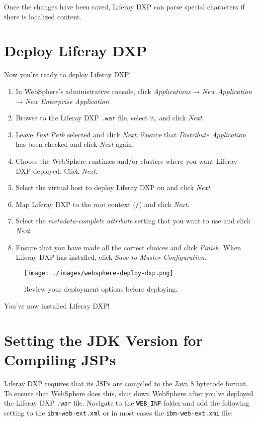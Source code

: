 Once the changes have been saved, Liferay DXP can parse special
characters if there is localized content.

\section{Deploy Liferay DXP}\label{deploy-liferay-dxp}

Now you're ready to deploy Liferay DXP!

\begin{enumerate}
\def\labelenumi{\arabic{enumi}.}
\item
  In WebSphere's administrative console, click \emph{Applications} →
  \emph{New Application} → \emph{New Enterprise Application}.
\item
  Browse to the Liferay DXP \texttt{.war} file, select it, and click
  \emph{Next}.
\item
  Leave \emph{Fast Path} selected and click \emph{Next}. Ensure that
  \emph{Distribute Application} has been checked and click \emph{Next}
  again.
\item
  Choose the WebSphere runtimes and/or clusters where you want Liferay
  DXP deployed. Click \emph{Next}.
\item
  Select the virtual host to deploy Liferay DXP on and click
  \emph{Next}.
\item
  Map Liferay DXP to the root context (\texttt{/}) and click
  \emph{Next}.
\item
  Select the \emph{metadata-complete attribute} setting that you want to
  use and click \emph{Next}.
\item
  Ensure that you have made all the correct choices and click
  \emph{Finish}. When Liferay DXP has installed, click \emph{Save to
  Master Configuration}.
\end{enumerate}

\begin{figure}
\centering
\texttt{[image: ./images/websphere-deploy-dxp.png]}
\caption{Review your deployment options before deploying.}
\end{figure}

You've now installed Liferay DXP!

\section{Setting the JDK Version for Compiling
JSPs}\label{setting-the-jdk-version-for-compiling-jsps}

Liferay DXP requires that its JSPs are compiled to the Java 8 bytecode
format. To ensure that WebSphere does this, shut down WebSphere after
you've deployed the Liferay DXP \texttt{.war} file. Navigate to the
\texttt{WEB\_INF} folder and add the following setting to the
\texttt{ibm-web-ext.xml} or in most cases the \texttt{ibm-web-ext.xmi}
file:

